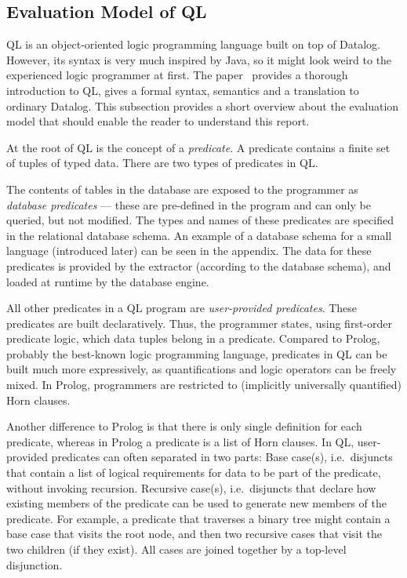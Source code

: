 \subsection{Evaluation Model of QL}
QL is an object-oriented logic programming language built on top of Datalog.
However, its syntax is very much inspired by Java, so it might look weird to the 
experienced logic programmer at first.
The paper~\cite{qlpaper} provides a thorough introduction to QL, gives a 
formal syntax, semantics and a translation to ordinary Datalog.
This subsection provides a short overview about the evaluation model that should
enable the reader to understand this report.

At the root of QL is the concept of a \emph{predicate}.
A predicate contains a finite set of tuples of typed data.
There are two types of predicates in QL.

The contents of tables in the database are exposed to the programmer as \emph{database 
predicates} --- these are pre-defined in the program and can only be queried, but not modified.
The types and names of these predicates are specified in the relational database schema.
An example of a database schema for a small language (introduced later) can be 
seen in the appendix.
The data for these predicates is provided by the extractor (according to the database schema),
and loaded at runtime by the database engine.

All other predicates in a QL program are \emph{user-provided predicates}.
These predicates are built declaratively.
Thus, the programmer states, using first-order predicate logic,
which data tuples belong in a predicate.
Compared to Prolog, probably the best-known logic programming language,
predicates in QL can be built much more expressively,
as quantifications and logic operators can be freely mixed.
In Prolog, programmers are restricted to (implicitly universally quantified) Horn clauses.

Another difference to Prolog is that there is only single definition for each predicate,
whereas in Prolog a predicate is a list of Horn clauses.
In QL, user-provided predicates can often separated in two parts:
Base case(s), i.e.\ disjuncts that contain a list of logical requirements for data 
to be part of the predicate, without invoking recursion.
Recursive case(s), i.e.\ disjuncts that declare how existing members of the predicate 
can be used to generate new members of the predicate.
For example, a predicate that traverses a binary tree might contain a base case that visits 
the root node, and then two recursive cases that visit the two children (if they exist).
All cases are joined together by a top-level disjunction.

